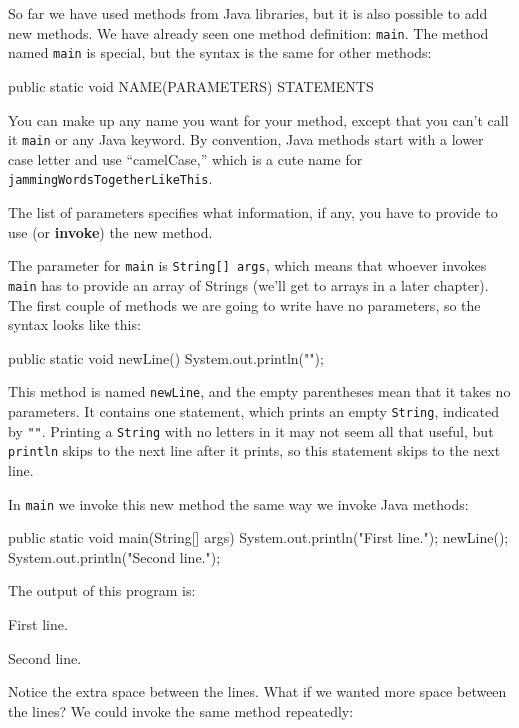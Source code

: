 So far we have used methods from Java libraries, but it is also possible to add new methods.
We have already seen one method definition: {\tt main}.
The method named {\tt main} is special, but the syntax is the same for other methods:

\begin{code}
    public static void NAME(PARAMETERS) {
        STATEMENTS
    }
\end{code}

You can make up any name you want for your method, except that you can't call it {\tt main} or any Java keyword.
By convention, Java methods start with a lower case letter and use ``camelCase,'' which is a cute name for {\tt jammingWordsTogetherLikeThis}.

The list of parameters specifies what information, if any, you have to provide to use (or {\bf invoke}) the new method.

The parameter for {\tt main} is {\tt String[] args}, which means that whoever invokes {\tt main} has to provide an array of Strings (we'll get to arrays in a later chapter).
The first couple of methods we are going to write have no parameters, so the syntax looks like this:

\begin{code}
    public static void newLine() {
      System.out.println("");
    }
\end{code}

This method is named {\tt newLine}, and the empty parentheses mean that it takes no parameters.
It contains one statement, which prints an empty {\tt String}, indicated by {\tt ""}.
Printing a {\tt String} with no letters in it may not seem all that useful, but {\tt println} skips to the next line after it prints, so this statement skips to the next line.

In {\tt main} we invoke this new method the same way we invoke Java methods:

\begin{code}
    public static void main(String[] args) {
        System.out.println("First line.");
        newLine();
        System.out.println("Second line.");
    }
\end{code}

The output of this program is:

\begin{stdout}
First line.

Second line.
\end{stdout}

Notice the extra space between the lines.
What if we wanted more space between the lines?
We could invoke the same method repeatedly:

